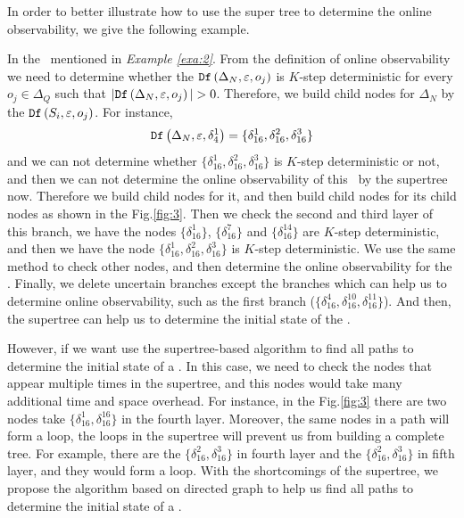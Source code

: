 In order to better illustrate how to use the super tree to determine the online observability, we give the following example.
  
\begin{example}
In the \BCN\ mentioned in {\em Example \ref{exa:2}}. From the definition of online observability we need to determine whether the ${\tt Df}\left(\Delta_N,\varepsilon,o_j\right)$ is $K$-step deterministic for every  $o_j \in \Delta_Q$ such that $|\Ded\left(\Delta_N,\varepsilon, o_j\right)|> 0$. Therefore, we build child nodes for $\Delta_N$ by the ${\tt Df}\left(S_i,\varepsilon, o_j\right)$. For instance, \[{\tt Df}\left(\Delta_N,\varepsilon,\delta_{4}^1\right)=\{\delta_{16}^1,\delta_{16}^2,\delta_{16}^3\}\] and we can not determine whether $\{\delta_{16}^1,\delta_{16}^2,\delta_{16}^3\}$ is $K$-step deterministic or not, and then we can not determine the online observability of this \BCN\ by the supertree now. Therefore we build child nodes for it, and then build child nodes for its child nodes as shown in the Fig.\ref{fig:3}. Then we check the second and third layer of this branch, we have the nodes $\{\delta_{16}^1\}$, $\{\delta_{16}^7\}$ and $\{\delta_{16}^{14}\}$ are $K$-step deterministic, and then we have the node $\{\delta_{16}^1,\delta_{16}^2,\delta_{16}^3\}$ is $K$-step deterministic. We use the same method to check other nodes, and then determine the online observability for the \BCN. Finally, we delete uncertain branches except the branches which can help us to determine online observability, such as the first branch ($\{\delta_{16}^{4},\delta_{16}^{10},\delta_{16}^{11}\}$). And then, the supertree can help us to determine the initial state of the \BCN.%

\end{example}   

However, if we want use the supertree-based algorithm to find all paths to determine the initial state of a \BCN. In this case, we need to check the nodes that appear multiple times in the supertree, and this nodes would take many additional time and space overhead. For instance, in the Fig.\ref{fig:3} there are two nodes take $\{\delta_{16}^1,\delta_{16}^{16}\}$ in the fourth layer. Moreover, the same nodes in a path will form a loop, the loops in the supertree will prevent us from building a complete tree. For example, there are the $\{\delta_{16}^2,\delta_{16}^3\}$ in fourth layer and the $\{\delta_{16}^2,\delta_{16}^3\}$ in fifth layer, and they would form a loop. With the shortcomings of the supertree, we propose the algorithm based on directed graph to help us find all paths to determine the initial state of a \BCN.
